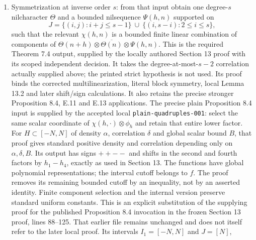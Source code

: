 \documentclass[11pt]{article}
\begin{document}
\begin{enumerate}
as the earlier version named in the frozen rank packet; its only
declared change makes the zero-index groups explicit. The new binding
is recorded here without rewriting that earlier freeze. All these
steps retain the full-limit vertical identities and uniform bounds.
The centered fractional-part convention in this chain is
$(-1/2,1/2]$, a fixed fundamental cube permitted by Section 12.
The reconstruction's acceptance remains conditional on its suppliers;
the affine-offset coefficient transfer is supplied by the local multifactor lemma, as connected below.
\item Symmetrization at inverse order $s$: from that input obtain one
degree-$s$ nilcharacter $\Theta$ and a bounded nilsequence $\Psi(h,n)$
supported on
\begin{equation}\label{eq:J}
 J=\{(i,j):i+j\leq s-1\}\ \cup\ \{(i,s-i):2\leq i\leq s\},
\end{equation}
such that the relevant $\chi(h,n)$ is a bounded finite linear combination
of components of
$\Theta(n+h)\otimes\overline{\Theta(n)}\otimes\Psi(h,n)$.
This is the required Theorem 7.4 output, supplied by the locally authored
Section 13 proof with its scoped independent decision. It takes the
degree-at-most-$s-2$ correlation actually supplied above; the printed
strict hypothesis is not used. Its proof binds the corrected
multilinearization, literal block symmetry, local Lemma 13.2 and later
shift/sign calculations. It also retains the precise stronger
Proposition 8.4, E.11 and E.13 applications. The precise plain
Proposition 8.4 input is supplied by the accepted local
\texttt{plain-quadruples-001}: select the same scalar coordinate of
$\chi(h,\cdot)\otimes\phi_h$ and retain that entire lower factor.
For $H\subset[-N,N]$ of density $\alpha$, correlation $\delta$ and
global scalar bound $B$, that proof gives standard positive density
and correlation depending only on $\alpha,\delta,B$. Its output has
signs $++--$ and shifts in the second and fourth factors by
$h_1-h_4$, exactly as used in Section 13. The functions have global
polynomial representations; the interval cutoff belongs to $f$.
The proof removes its remaining bounded cutoff by an inequality,
not by an asserted identity. Finite component selection and the
internal version preserve standard uniform constants.
This is an explicit substitution of the supplying proof for the
published Proposition 8.4 invocation in the frozen Section 13 proof,
lines 88--125. That earlier file remains unchanged and does not itself
refer to the later local proof. Its intervals $I_1=[-N,N]$ and $J=[N]$,

\end{enumerate}
\end{document}
